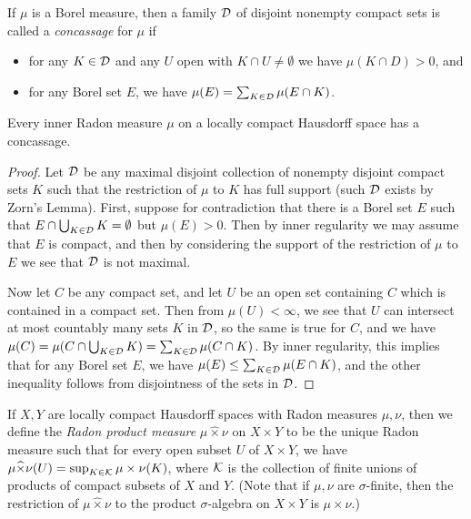 \begin{defn} If $\mu$ is a Borel measure, then a family $\mathcal{D}$ of disjoint nonempty compact sets is called a \emph{concassage} for $\mu$ if
\begin{itemize}
\item for any $K \in \mathcal{D}$ and any $U$ open with $K \cap U \ne \emptyset$ we have $\mu(K \cap D) > 0$, and

\item for any Borel set $E$, we have $\mu(E) = \sum_{K \in \mathcal{D}} \mu(E \cap K)$.
\end{itemize}
\end{defn}

\begin{prop} Every inner Radon measure $\mu$ on a locally compact Hausdorff space has a concassage.
\end{prop}
\begin{proof} Let $\mathcal{D}$ be any maximal disjoint collection of nonempty disjoint compact sets $K$ such that the restriction of $\mu$ to $K$ has full support (such $\mathcal{D}$ exists by Zorn's Lemma). First, suppose for contradiction that there is a Borel set $E$ such that $E \cap \bigcup_{K \in \mathcal{D}} K = \emptyset$ but $\mu(E) > 0$. Then by inner regularity we may assume that $E$ is compact, and then by considering the support of the restriction of $\mu$ to $E$ we see that $\mathcal{D}$ is not maximal.

Now let $C$ be any compact set, and let $U$ be an open set containing $C$ which is contained in a compact set. Then from $\mu(U) < \infty$, we see that $U$ can intersect at most countably many sets $K$ in $\mathcal{D}$, so the same is true for $C$, and we have $\mu(C) = \mu(C \cap \bigcup_{K \in \mathcal{D}} K) = \sum_{K \in \mathcal{D}} \mu(C \cap K)$. By inner regularity, this implies that for any Borel set $E$, we have $\mu(E) \le \sum_{K \in \mathcal{D}} \mu(E \cap K)$, and the other inequality follows from disjointness of the sets in $\mathcal{D}$.
\end{proof}

\begin{defn} If $X,Y$ are locally compact Hausdorff spaces with Radon measures $\mu,\nu$, then we define the \emph{Radon product measure} $\mu\widehat{\times}\nu$ on $X\times Y$ to be the unique Radon measure such that for every open subset $U$ of $X\times Y$, we have $\mu\widehat{\times}\nu(U) = \sup_{K \in \mathcal{K}} \mu\times\nu(K)$, where $\mathcal{K}$ is the collection of finite unions of products of compact subsets of $X$ and $Y$. (Note that if $\mu, \nu$ are $\sigma$-finite, then the restriction of $\mu\widehat{\times}\nu$ to the product $\sigma$-algebra on $X\times Y$ is $\mu\times\nu$.)
\end{defn}

